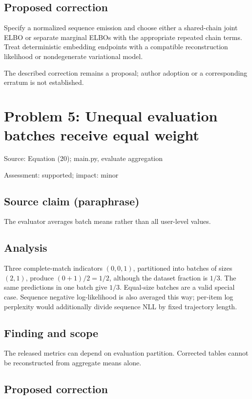 \documentclass[11pt]{article}
\begin{document}
\subsection*{Proposed correction}

Specify a normalized sequence emission and choose either a shared-chain joint ELBO or separate marginal ELBOs with the appropriate repeated chain terms. Treat deterministic embedding endpoints with a compatible reconstruction likelihood or nondegenerate variational model.

The described correction remains a proposal; author adoption or a corresponding erratum is not established.

\section*{Problem 5: Unequal evaluation batches receive equal weight}

Source: Equation (20); main.py, evaluate aggregation

Assessment: supported; impact: minor

\subsection*{Source claim (paraphrase)}

The evaluator averages batch means rather than all user-level values.

\subsection*{Analysis}

Three complete-match indicators \((0,0,1)\), partitioned into batches of sizes \((2,1)\), produce \((0+1)/2=1/2\), although the dataset fraction is \(1/3\). The same predictions in one batch give \(1/3\). Equal-size batches are a valid special case. Sequence negative log-likelihood is also averaged this way; per-item log perplexity would additionally divide sequence NLL by fixed trajectory length.

\subsection*{Finding and scope}

The released metrics can depend on evaluation partition. Corrected tables cannot be reconstructed from aggregate means alone.

\subsection*{Proposed correction}
\end{document}
